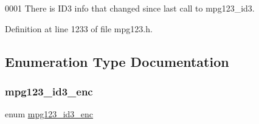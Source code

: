 0001 There is I\+D3 info that changed since last call to mpg123\+\_\+id3. 

Definition at line 1233 of file mpg123.\+h.



\subsection{Enumeration Type Documentation}
\mbox{\label{group__mpg123__metadata_ga6a01e07e0e0770d6912767c2638fa86c}} 
\subsubsection{\texorpdfstring{mpg123\_id3\_enc}{mpg123\_id3\_enc}}
{\footnotesize\ttfamily enum \mbox{\hyperlink{group__mpg123__metadata_ga6a01e07e0e0770d6912767c2638fa86c}{mpg123\+\_\+id3\+\_\+enc}}}

